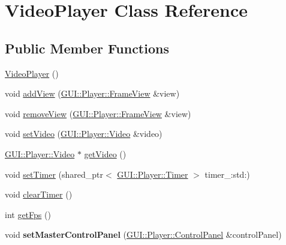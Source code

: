 \hypertarget{classGUI_1_1Player_1_1VideoPlayer}{}\section{Video\+Player Class Reference}
\label{classGUI_1_1Player_1_1VideoPlayer}
\subsection*{Public Member Functions}
\begin{DoxyCompactItemize}
\item 
\hyperlink{classGUI_1_1Player_1_1VideoPlayer_af6d7bb082887f6a9738741778c58daf8}{Video\+Player} ()
\item 
void \hyperlink{classGUI_1_1Player_1_1VideoPlayer_a8798b9f0655dcf3847ad1819da59323e}{add\+View} (\hyperlink{classGUI_1_1Player_1_1FrameView}{G\+U\+I\+::\+Player\+::\+Frame\+View} \&view)
\item 
void \hyperlink{classGUI_1_1Player_1_1VideoPlayer_a4d9422b651eeeb1e2098195adb7a3501}{remove\+View} (\hyperlink{classGUI_1_1Player_1_1FrameView}{G\+U\+I\+::\+Player\+::\+Frame\+View} \&view)
\item 
void \hyperlink{classGUI_1_1Player_1_1VideoPlayer_a9e4f56467f009458dad24ae7a3e925f9}{set\+Video} (\hyperlink{classGUI_1_1Player_1_1Video}{G\+U\+I\+::\+Player\+::\+Video} \&video)
\item 
\hyperlink{classGUI_1_1Player_1_1Video}{G\+U\+I\+::\+Player\+::\+Video} $\ast$ \hyperlink{classGUI_1_1Player_1_1VideoPlayer_a65419d9046cd65aeebf45a22a262461d}{get\+Video} ()
\item 
void \hyperlink{classGUI_1_1Player_1_1VideoPlayer_a44256b3379b72ded0c680516878aac43}{set\+Timer} (shared\+\_\+ptr$<$ \hyperlink{classGUI_1_1Player_1_1Timer}{G\+U\+I\+::\+Player\+::\+Timer} $>$ timer\+\_\+\+:std\+:)
\item 
void \hyperlink{classGUI_1_1Player_1_1VideoPlayer_ac99343fd51cdad1ee430905a00791ade}{clear\+Timer} ()
\item 
int \hyperlink{classGUI_1_1Player_1_1VideoPlayer_a519ad5c0664b9de28c1a6d9dc77f959d}{get\+Fps} ()
\item 
\hypertarget{classGUI_1_1Player_1_1VideoPlayer_a152f8d8b5f3756518ea5b57ad12814a3}{}void {\bfseries set\+Master\+Control\+Panel} (\hyperlink{classGUI_1_1Player_1_1ControlPanel}{G\+U\+I\+::\+Player\+::\+Control\+Panel} \&control\+Panel)\label{classGUI_1_1Player_1_1VideoPlayer_a152f8d8b5f3756518ea5b57ad12814a3}


\end{DoxyCompactItemize}
